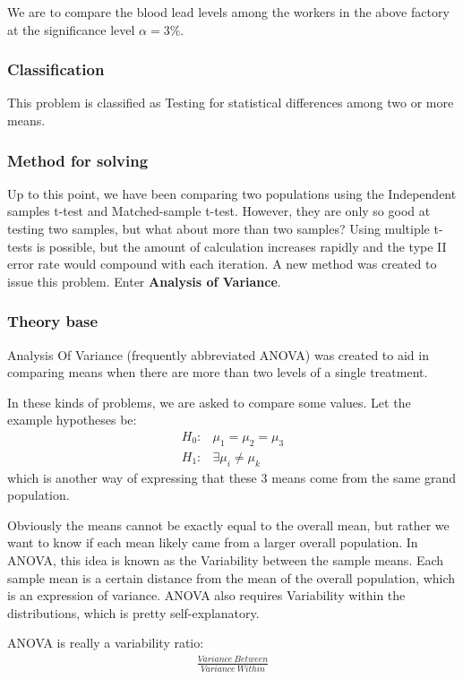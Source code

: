 \documentclass[a4paper]{article}
\numberwithin{equation}{section}
\begin{document}
We are to compare the blood lead levels among the workers in the above factory at the significance level \( \alpha = 3\% \).

\subsubsection{Classification}
This problem is classified as Testing for statistical differences among two or more means.

\subsubsection{Method for solving}
Up to this point, we have been comparing two populations using the Independent samples t-test and Matched-sample t-test.
However, they are only so good at testing two samples, but what about more than two samples?
Using multiple t-tests is possible, but the amount of calculation increases rapidly and the type II error rate would compound with each iteration.
A new method was created to issue this problem.
Enter \textbf{Analysis of Variance}.

\subsubsection{Theory base}\label{anovaDef}
Analysis Of Variance (frequently abbreviated ANOVA) was created to aid in comparing means when there are more than two levels of a single treatment.

In these kinds of problems, we are asked to compare some values. Let the example hypotheses be:
\begin{align*}
  H_0: & \mu_1 = \mu_2 = \mu_3    \\
  H_1: & \exists \mu_i \neq \mu_k
\end{align*}
which is another way of expressing that these 3 means come from the same grand population.

Obviously the means cannot be exactly equal to the overall mean, but rather we want to know if each mean likely came from a larger overall population.
In ANOVA, this idea is known as the Variability between the sample means.
Each sample mean is a certain distance from the mean of the overall population, which is an expression of variance.
ANOVA also requires Variability within the distributions, which is pretty self-explanatory.

ANOVA is really a variability ratio:
\begin{align*}
  \frac{Variance\ Between}{Variance\ Within}
\end{align*}
\end{document}
